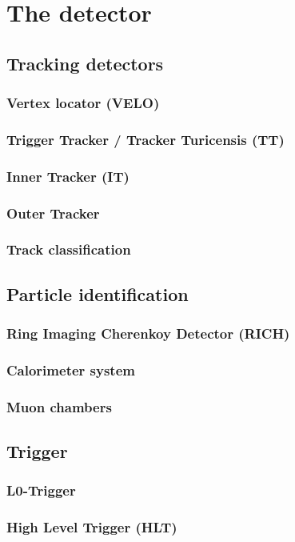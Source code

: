 \chapter{The \lhcb detector}
\label{sec:detector}

\section{Tracking detectors}

\subsection{Vertex locator (VELO)}

\subsection{Trigger Tracker / Tracker Turicensis (TT)}

\subsection{Inner Tracker (IT)}

\subsection{Outer Tracker}

\subsection{Track classification}


\section{Particle identification}

\subsection{Ring Imaging Cherenkoy Detector (RICH)}

\subsection{Calorimeter system}

\subsection{Muon chambers}

\section{Trigger}

\subsection{L0-Trigger}

\subsection{High Level Trigger (HLT)}